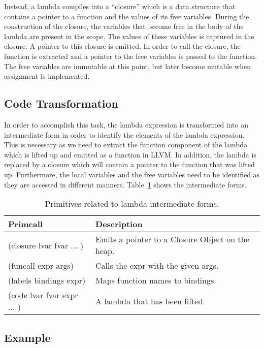 \documentclass{article}
\begin{document}
Instead, a lambda compiles into a ``closure'' which is a data structure that contains a pointer to a function and the values of its free variables. During the construction of the closure, the variables that become free in the body of the lambda are present in the scope. The values of these variables is captured in the closure. A pointer to this closure is emitted. In order to call the closure, the function is extracted and a pointer to the free variables is passed to the function. The free variables are immutable at this point, but later become mutable when assignment is implemented. 
 
\subsection{Code Transformation}

In order to accomplish this task, the lambda expression is transformed into an intermediate form in order to identify the elements of the lambda expression. This is necessary as we need to extract the function component of the lambda which is lifted up and emitted as a function in LLVM. In addition, the lambda is replaced by a closure which will contain a pointer to the function that was lifted up. Furthermore, the local variables and the free variables need to be identified as they are accessed in different manners.  Table~\ref{tab:lambda_intermediate} shows the intermediate forms. 

\begin{table}[ht]
  \centering
\begin{tabular}{ l l }
  \toprule
  Primcall & Description \\ \hline
  \midrule
  (closure lvar fvar ... ) & Emits a pointer to a Closure Object on the heap.  \\
  (funcall expr args) & Calls the expr with the given args.  \\
  (labels bindings expr) & Maps function names to bindings. \\
  (code lvar fvar expr ... ) & A lambda that has been lifted.  \\
  \bottomrule
\end{tabular}
\caption{Primitives related to lambda intermediate forms.} \label{tab:lambda_intermediate}
\end{table}

\subsection{Example}
\end{document}
